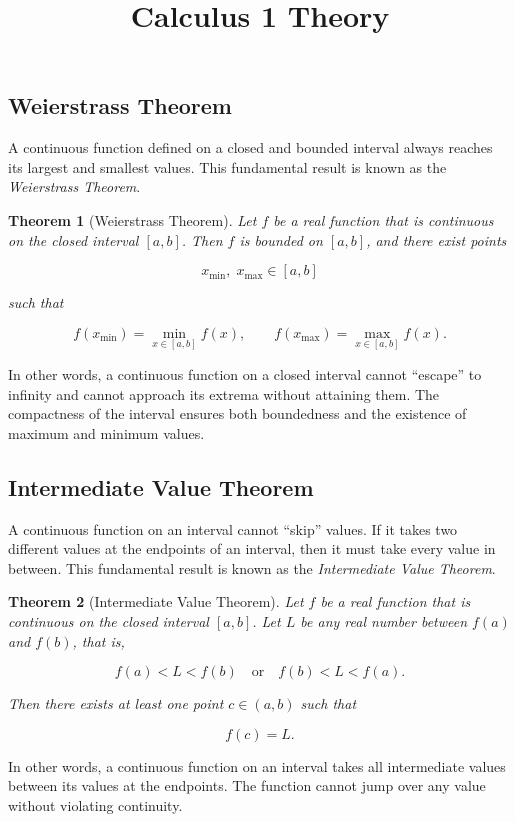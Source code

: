 \documentclass[11pt,a4paper]{article} \usepackage[T1]{fontenc}
\theoremstyle{plain} \newtheorem{theorem}{Theorem} \title{Calculus 1 Theory}
\begin{document}
\subsection{Weierstrass Theorem}

A continuous function defined on a closed and bounded interval always reaches
its largest and smallest values. This fundamental result is known as the
\emph{Weierstrass Theorem}.

\begin{theorem}
[Weierstrass Theorem] Let $f$ be a real function that is continuous on the
closed interval $[a,b]$. Then $f$ is bounded on $[a,b]$, and there exist points

\[
x_{\min},\; x_{\max} \in [a,b]
\]

such that

\[
f(x_{\min}) = \min_{x \in [a,b]} f(x), \qquad f(x_{\max}) = \max_{x \in [a,b]} f(x).
\]

\end{theorem}

In other words, a continuous function on a closed interval cannot “escape” to
infinity and cannot approach its extrema without attaining them. The
compactness of the interval ensures both boundedness and the existence of
maximum and minimum values.

\subsection{Intermediate Value Theorem}

A continuous function on an interval cannot “skip” values. If it takes two
different values at the endpoints of an interval, then it must take every value
in between. This fundamental result is known as the \emph{Intermediate Value
Theorem}.

\begin{theorem}
[Intermediate Value Theorem] Let $f$ be a real function that is continuous on
the closed interval $[a,b]$. Let $L$ be any real number between $f(a)$ and
$f(b)$, that is,

\[
f(a) < L < f(b) \quad \text{or} \quad f(b) < L < f(a).
\]

Then there exists at least one point $c \in (a,b)$ such that

\[
f(c) = L.
\]

\end{theorem}

In other words, a continuous function on an interval takes all intermediate
values between its values at the endpoints. The function cannot jump over any
value without violating continuity.
\end{document}
